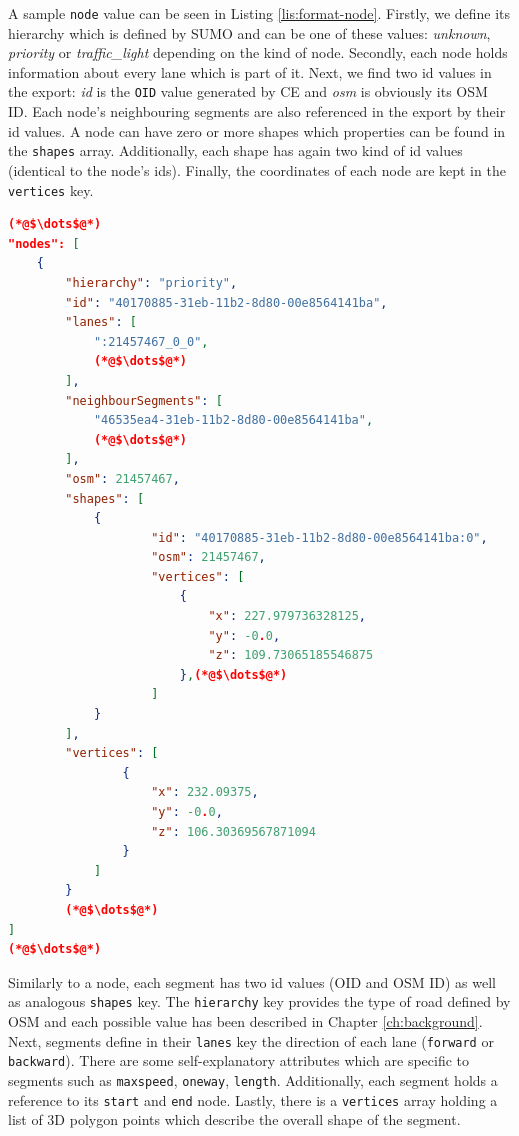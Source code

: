 A sample \texttt{node} value can be seen in Listing \ref{lis:format-node}. Firstly, we define its hierarchy which is defined by SUMO and can be one of these values: \emph{unknown}, \emph{priority} or \emph{traffic\_light} depending on the kind of node. Secondly, each node holds information about every lane which is part of it. Next, we find two id values in the export: \emph{id} is the \texttt{OID} value generated by CE and \emph{osm} is obviously its OSM ID. Each node's neighbouring segments are also referenced in the export by their id values. A node can have zero or more shapes which properties can be found in the \texttt{shapes} array. Additionally, each shape has again two kind of id values (identical to the node's ids). Finally, the coordinates of each node are kept in the \texttt{vertices} key.\\
 	
    \begin{scriptsize}
        \begin{lstlisting}[language=json,firstnumber=1,caption={General overview of the node key in the JSON exportformat.},label={lis:format-node}]
(*@$\dots$@*)
"nodes": [
    {
        "hierarchy": "priority",
        "id": "40170885-31eb-11b2-8d80-00e8564141ba",
        "lanes": [
            ":21457467_0_0",
            (*@$\dots$@*)
        ],
        "neighbourSegments": [
            "46535ea4-31eb-11b2-8d80-00e8564141ba",
            (*@$\dots$@*)
        ],
        "osm": 21457467,
        "shapes": [
            {
                    "id": "40170885-31eb-11b2-8d80-00e8564141ba:0",
                    "osm": 21457467,
                    "vertices": [
                        {
                            "x": 227.979736328125,
                            "y": -0.0,
                            "z": 109.73065185546875
                        },(*@$\dots$@*)
                    ]
            }
        ],
        "vertices": [
                {
                    "x": 232.09375,
                    "y": -0.0,
                    "z": 106.30369567871094
                }
            ]
        }
        (*@$\dots$@*)
]
(*@$\dots$@*)
	   \end{lstlisting}
    \end{scriptsize}
    
Similarly to a node, each segment has two id values (OID and OSM ID) as well as analogous \texttt{shapes} key. The \texttt{hierarchy} key provides the type of road defined by OSM and each possible value has been described in Chapter \ref{ch:background}. Next, segments define in their \texttt{lanes} key the direction of each lane (\texttt{forward} or \texttt{backward}). There are some self-explanatory attributes which are specific to segments such as \texttt{maxspeed}, \texttt{oneway}, \texttt{length}. Additionally, each segment holds a reference to its \texttt{start} and \texttt{end} node. Lastly, there is a \texttt{vertices} array holding a list of 3D polygon points which describe the overall shape of the segment.\\

